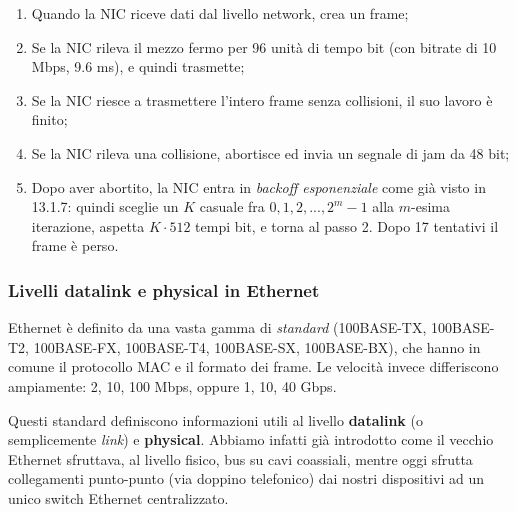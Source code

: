 \documentclass[a4paper,11pt]{article}
\begin{document}
\begin{enumerate}
	\item Quando la NIC riceve dati dal livello network, crea un frame;
	\item Se la NIC rileva il mezzo fermo per 96 unità di tempo bit (con bitrate di 10 Mbps, 9.6 ms), e quindi trasmette;
	\item Se la NIC riesce a trasmettere l'intero frame senza collisioni, il suo lavoro è finito;
	\item Se la NIC rileva una collisione, abortisce ed invia un segnale di jam da 48 bit;
\item Dopo aver abortito, la NIC entra in \textit{backoff esponenziale} come già visto in 13.1.7: quindi sceglie un $K$ casuale fra ${0, 1, 2, ..., 2^m - 1}$ alla $m$-esima iterazione, aspetta $K \cdot 512$ tempi bit, e torna al passo 2. Dopo 17 tentativi il frame è perso.
\end{enumerate}

\subsubsection{Livelli datalink e physical in Ethernet}
Ethernet è definito da una vasta gamma di \textit{standard} (100BASE-TX, 100BASE-T2, 100BASE-FX, 100BASE-T4, 100BASE-SX, 100BASE-BX), che hanno in comune il protocollo MAC e il formato dei frame. Le velocità invece differiscono ampiamente: 2, 10, 100 Mbps, oppure 1, 10, 40 Gbps.

Questi standard definiscono informazioni utili al livello \textbf{datalink} (o semplicemente \textit{link}) e \textbf{physical}.
Abbiamo infatti già introdotto come il vecchio Ethernet sfruttava, al livello fisico, bus su cavi coassiali, mentre oggi sfrutta collegamenti punto-punto (via doppino telefonico) dai nostri dispositivi ad un unico switch Ethernet centralizzato.
\end{document}
